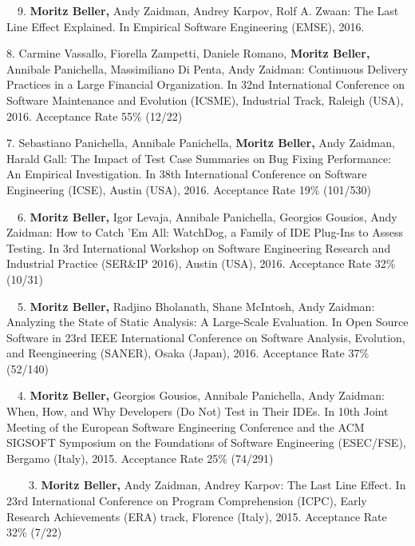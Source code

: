 \begin{etaremune}
{\item[\faFileTextO~~9.] \textbf{Moritz Beller,} Andy Zaidman, Andrey Karpov, Rolf A. Zwaan: The
  Last Line Effect Explained. In Empirical Software Engineering (EMSE), 2016.

\item[8.] Carmine Vassallo, Fiorella Zampetti, Daniele Romano, \textbf{Moritz Beller,} Annibale
  Panichella, Massimiliano Di Penta, Andy Zaidman: Continuous Delivery Practices in a Large
  Financial Organization. In 32nd International Conference on Software Maintenance and Evolution
  (ICSME), Industrial Track, Raleigh (USA), 2016. Acceptance Rate 55\% (12/22)

\item[7.] Sebastiano Panichella, Annibale Panichella, \textbf{Moritz Beller,} Andy Zaidman, Harald
  Gall: The Impact of Test Case Summaries on Bug Fixing Performance: An Empirical Investigation. In
  38th International Conference on Software Engineering (ICSE), Austin (USA), 2016. Acceptance Rate
  19\% (101/530)

\item[\faFileTextO~~6.] \textbf{Moritz Beller,} Igor Levaja, Annibale Panichella, Georgios Gousios,
  Andy Zaidman: How to Catch ’Em All: WatchDog, a Family of IDE Plug-Ins to Assess Testing. In 3rd
  International Workshop on Software Engineering Research and Industrial Practice (SER\&IP 2016),
  Austin (USA), 2016. Acceptance Rate 32\% (10/31)

\item[\faFileTextO~~5.] \textbf{Moritz Beller,} Radjino Bholanath, Shane McIntosh, Andy
  Zaidman: Analyzing the State of Static Analysis: A Large-Scale Evaluation. In Open Source
  Software in 23rd IEEE International Conference on Software Analysis, Evolution, and Reengineering
  (SANER), Osaka (Japan), 2016. Acceptance Rate 37\% (52/140)

\item[\faFileTextO~~4.] \textbf{Moritz Beller,} Georgios Gousios, Annibale Panichella, Andy
  Zaidman: When, How, and Why Developers (Do Not) Test in Their IDEs. In 10th Joint Meeting of the
  European Software Engineering Conference and the ACM SIGSOFT Symposium on the Foundations of
  Software Engineering (ESEC/FSE), Bergamo (Italy), 2015. Acceptance Rate 25\% (74/291)

\item[\faTrophy~~\faFileTextO~~3.] \textbf{Moritz Beller,} Andy Zaidman, Andrey Karpov: The Last
  Line Effect. In 23rd International Conference on Program Comprehension (ICPC), Early Research
  Achievements (ERA) track, Florence (Italy), 2015. Acceptance Rate 32\% (7/22)

}
\end{etaremune}
